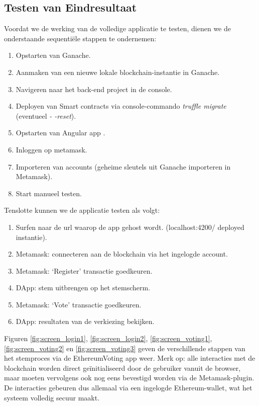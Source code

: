 	\subsection{Testen van Eindresultaat}
	Voordat we de werking van de volledige applicatie te testen, dienen we de onderstaande sequentiële stappen te ondernemen:
	\begin{enumerate}
		\item Opstarten van Ganache.
		\item Aanmaken van een nieuwe lokale blockchain-instantie in Ganache.
		\item Navigeren naar het back-end project in de console.
		\item Deployen van Smart contracts via console-commando \textit{truffle migrate} (eventueel \textit{- -reset}).
		\item Opstarten van Angular app .
		\item Inloggen op metamask.
		\item Importeren van accounts (geheime sleutels uit Ganache importeren in Metamask).
		\item Start manueel testen.
	\end{enumerate}
	Tenslotte kunnen we de applicatie testen als volgt:
	\begin{enumerate}
		\item Surfen naar de url waarop de app gehost wordt. (localhost:4200/ deployed instantie).
		\item Metamask: connecteren aan de blockchain via het ingelogde account.
		\item Metamask: `Register' transactie goedkeuren.
		\item DApp: stem uitbrengen op het stemscherm.
		\item Metamask: `Vote' transactie goedkeuren.
		\item DApp: resultaten van de verkiezing bekijken.
	\end{enumerate}
	Figuren \ref{fig:screen_login1}, \ref{fig:screen_login2}, \ref{fig:screen_voting1}, \ref{fig:screen_voting2}  en \ref{fig:screen_voting3} geven de verschillende stappen van het stemproces via de EthereumVoting app weer. Merk op: alle interacties met de blockchain worden direct geïnitialiseerd door de gebruiker vanuit de browser, maar moeten vervolgens ook nog eens bevestigd worden via de Metamask-plugin. De interacties gebeuren dus allemaal via een ingelogde Ethereum-wallet, wat het systeem volledig secuur maakt.
